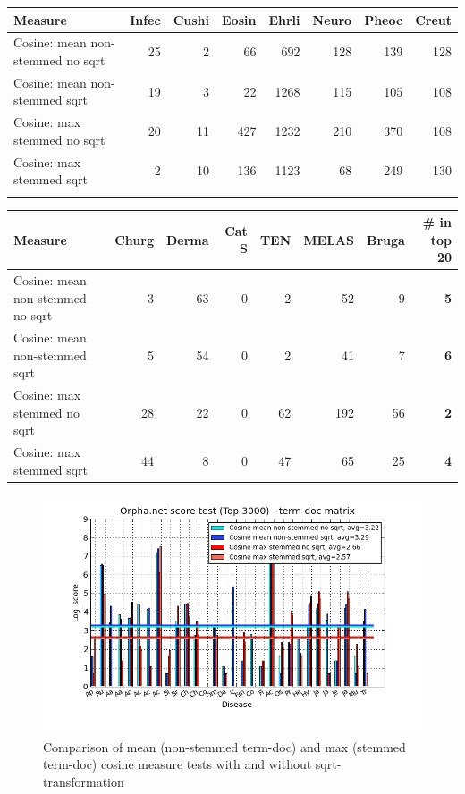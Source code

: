 \begin{table}[H]
  \begin{tiny}
    \begin{tabular}{|l|r|r|r|r|r|r|r|}
      \hline
      Measure &Infec&Cushi&Eosin&Ehrli&Neuro&Pheoc&Creut \\
      \hline
      Cosine: mean non-stemmed no sqrt &25&2&66&692&128&139&128 \\
      \hline
      Cosine: mean non-stemmed sqrt &19&3&22&1268&115&105&108 \\
      \hline
      Cosine: max stemmed no sqrt &20&11&427&1232&210&370&108 \\
      \hline
      Cosine: max stemmed sqrt &2&10&136&1123&68&249&130 \\
      \hline
      \multicolumn{8}{c}{} \\
    \end{tabular}
    \begin{tabular}{|l|r|r|r|r|r|r|r|}
      \hline
      Measure &Churg&Derma&Cat S&TEN&MELAS&Bruga& \scriptsize{\textbf{\# in top 20}} \\
      \hline
      Cosine: mean non-stemmed no sqrt &3&63&0&2&52&9 &\scriptsize{\textbf{5}} \\
      \hline
      Cosine: mean non-stemmed sqrt &5&54&0&2&41&7 &\scriptsize{\textbf{6}}\\
      \hline
      Cosine: max stemmed no sqrt &28&22&0&62&192&56 & \scriptsize{\textbf{2}} \\
      \hline
      Cosine: max stemmed sqrt &44&8&0&47&65&25 & \scriptsize{\textbf{4}} \\
      \hline
    \end{tabular}
  \end{tiny}
\end{table}

\begin{figure}[H]
  \caption{Comparison of mean (non-stemmed term-doc) and max (stemmed term-doc) cosine measure tests with and without sqrt-transformation}
  \begin{center}
    \includegraphics[width=1.2\textwidth]{barcharts/termDoc_orphan_hist_3000_ns_mea_ns_mea_sqr_s_max_s_max_sqr.png}
  \end{center}  
  \label{termDoc_orphan_hist_3000_ns_mea_ns_mea_sqr_s_max_s_max_sqr}
\end{figure}

